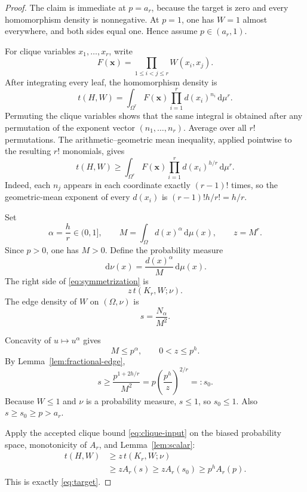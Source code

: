 \documentclass[11pt]{article}
\newcommand{\dd}{\,\mathrm d}
\begin{document}
\begin{proof}
The claim is immediate at $p=a_r$, because the target is zero and every
homomorphism density is nonnegative.  At $p=1$, one has $W=1$ almost
everywhere, and both sides equal one.  Hence assume $p\in(a_r,1)$.

For clique variables $x_1,\ldots,x_r$, write
\[
 F(\boldsymbol x)=\prod_{1\leq i<j\leq r}W(x_i,x_j).
\]
After integrating every leaf, the homomorphism density is
\[
 t(H,W)=\int_{\Omega^r}F(\boldsymbol x)
              \prod_{i=1}^r d(x_i)^{n_i}\dd\mu^r.
\]
Permuting the clique variables shows that the same integral is obtained
after any permutation of the exponent vector $(n_1,\ldots,n_r)$.  Average
over all $r!$ permutations.  The arithmetic--geometric mean inequality,
applied pointwise to the resulting $r!$ monomials, gives
\begin{equation}
 t(H,W)
 \geq\int_{\Omega^r}F(\boldsymbol x)
       \prod_{i=1}^r d(x_i)^{h/r}\dd\mu^r.
 \label{eq:symmetrization}
\end{equation}
Indeed, each $n_j$ appears in each coordinate exactly $(r-1)!$ times, so
the geometric-mean exponent of every $d(x_i)$ is
$(r-1)!h/r!=h/r$.

Set
\[
 \alpha=\frac hr\in(0,1],
 \qquad
 M=\int_\Omega d(x)^\alpha\dd\mu(x),
 \qquad
 z=M^r.
\]
Since $p>0$, one has $M>0$.  Define the probability measure
\[
 \dd\nu(x)=\frac{d(x)^\alpha}{M}\dd\mu(x).
\]
The right side of \eqref{eq:symmetrization} is
\begin{equation}
 z\,t(K_r,W;\nu).
 \label{eq:measure-change}
\end{equation}
The edge density of $W$ on $(\Omega,\nu)$ is
\[
 s=\frac{N_\alpha}{M^2}.
\]

Concavity of $u\mapsto u^\alpha$ gives
\[
 M\leq p^\alpha,
 \qquad
 0<z\leq p^h.
\]
By Lemma~\ref{lem:fractional-edge},
\[
 s\geq\frac{p^{1+2h/r}}{M^2}
 =p\left(\frac{p^h}{z}\right)^{2/r}
 =:s_0.
\]
Because $W\leq1$ and $\nu$ is a probability measure, $s\leq1$, so
$s_0\leq1$.  Also $s\geq s_0\geq p>a_r$.

Apply the accepted clique bound \eqref{eq:clique-input} on the biased
probability space, monotonicity of $A_r$, and Lemma~\ref{lem:scalar}:
\begin{align*}
 t(H,W)
 &\geq z\,t(K_r,W;\nu)\\
 &\geq zA_r(s)
 \geq zA_r(s_0)
 \geq p^hA_r(p).
\end{align*}
This is exactly \eqref{eq:target}.
\end{proof}
\end{document}
